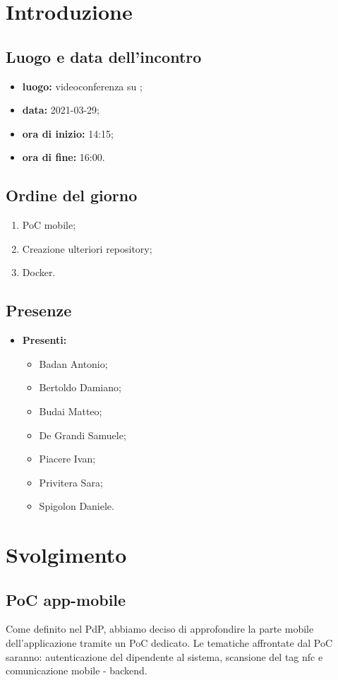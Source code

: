 \section*{Introduzione}
\subsection*{Luogo e data dell'incontro}
\begin{itemize}
	\item \textbf{luogo:} videoconferenza su ;
	\item \textbf{data:}  2021-03-29;
	\item \textbf{ora di inizio:} 14:15;
	\item \textbf{ora di fine:} 16:00.
\end{itemize}

\subsection*{Ordine del giorno}
\begin{enumerate}
	\item PoC mobile;
	\item Creazione ulteriori repository;
	\item Docker.
\end{enumerate}

\subsection*{Presenze}
\begin{itemize}
	\item \textbf{Presenti:}
	\begin{itemize}
		\item Badan Antonio;
		\item Bertoldo Damiano;
		\item Budai Matteo;
		\item De Grandi Samuele;
		\item Piacere Ivan;
		\item Privitera Sara;
		\item Spigolon Daniele.
	\end{itemize}
\end{itemize}

\section*{Svolgimento}
\subsection*{PoC app-mobile}
Come definito nel PdP, abbiamo deciso di approfondire la parte mobile dell'applicazione tramite un PoC dedicato. Le tematiche affrontate dal PoC saranno: autenticazione del dipendente al sistema, scansione del tag nfc e comunicazione mobile - backend. 

